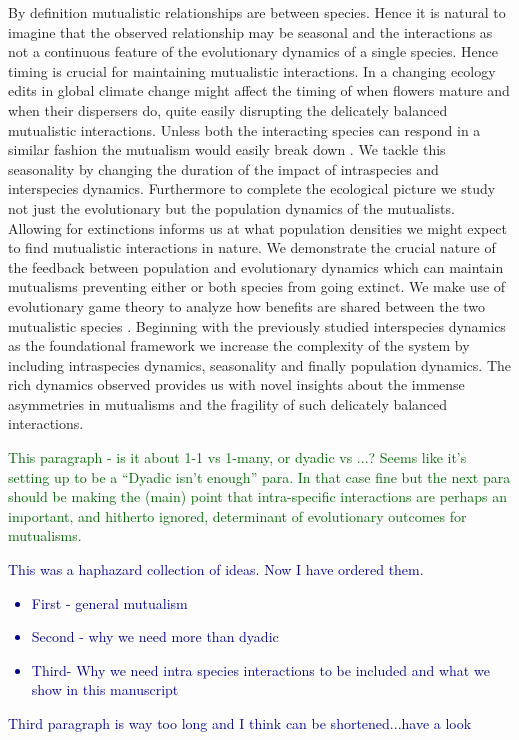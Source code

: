 \documentclass[12pt]{article}
\newcommand{\cha}[1]{\textcolor{darkblue}{#1}}
\newcommand{\marcus}[1]{\textcolor{darkgreen}{#1}}
\begin{document}
By definition mutualistic relationships are between species.
Hence it is natural to imagine that the observed relationship may be seasonal and the interactions as not a continuous feature of the evolutionary dynamics of a single species.
Hence timing is crucial for maintaining mutualistic interactions.
In a changing ecology edits in global climate change might affect the timing of when flowers mature and when their dispersers do, quite easily disrupting the delicately balanced mutualistic interactions.
Unless both the interacting species can respond in a similar fashion the mutualism would easily break down \citep{warren:GCB:2014}.
We tackle this seasonality by changing the duration of the impact of intraspecies and interspecies dynamics.
Furthermore to complete the ecological picture we study not just the evolutionary but the population dynamics of the mutualists.
Allowing for extinctions informs us at what population densities we might expect to find mutualistic interactions in nature.
We demonstrate the crucial nature of the feedback between population and evolutionary dynamics which can maintain mutualisms preventing either or both species from going extinct. 
We make use of evolutionary game theory to analyze how benefits are shared between the two mutualistic species
\citep{weibull:book:1995,hofbauer:JMB:1996,hofbauer:book:1998}.
Beginning with the previously studied interspecies dynamics as the foundational framework \citep{gokhale:PRSB:2012} we increase the complexity of the system by including intraspecies dynamics, seasonality and finally population dynamics.
The rich dynamics observed provides us with novel insights about the immense asymmetries in mutualisms and the fragility of such delicately balanced interactions.

\marcus{This paragraph - is it about 1-1 vs 1-many, or dyadic vs ...?  Seems like it's setting up to be a ``Dyadic isn't enough'' para. In that case fine but the next para should be making the (main) point that intra-specific interactions are perhaps an important, and hitherto ignored, determinant of evolutionary outcomes for mutualisms.  }
\cha{This was a haphazard collection of ideas. Now I have ordered them.
\begin{itemize}
	\item First - general mutualism
\item Second - why we need more than dyadic
\item Third- Why we need intra species interactions to be included and what we show in this manuscript
\end{itemize}
Third paragraph is way too long and I think can be shortened...have a look
}
\end{document}
